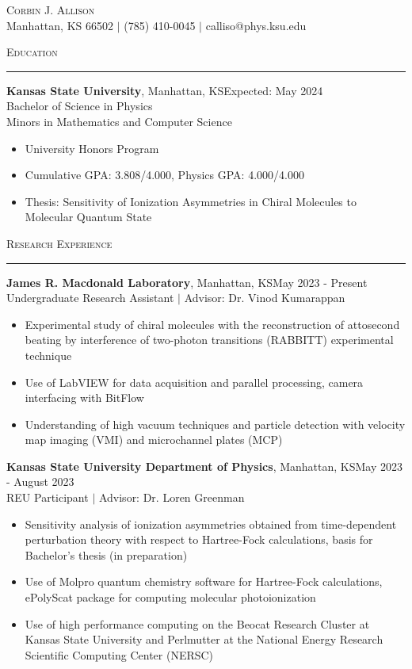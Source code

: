 \documentclass{article}
\newcommand{\sect}[1]{
\noindent\large{\textsc{#1}}\\[-6pt]\normalsize{\noindent\rule{\textwidth}{0.5pt}}
}
\begin{document}
\noindent\begin{center}
	{\huge{\textsc{Corbin J. Allison}}}\\
	Manhattan, KS 66502 $ | $ (785) 410-0045 $ | $ calliso@phys.ksu.edu
\end{center}
\sect{Education} \textbf{Kansas State University}, Manhattan, KS\hfill Expected: May 2024 \\
Bachelor of Science in Physics\\ Minors in Mathematics and Computer Science \begin{itemize}
	\item University Honors Program
	\item Cumulative GPA: 3.808/4.000, Physics GPA: 4.000/4.000
	\item Thesis: Sensitivity of Ionization Asymmetries in Chiral Molecules to Molecular Quantum State 
\end{itemize}
\sect{Research Experience}
\textbf{James R. Macdonald Laboratory}, Manhattan, KS\hfill May 2023 - Present\\
{Undergraduate Research Assistant $ | $ Advisor: Dr. Vinod Kumarappan} \begin{itemize}
	\item Experimental study of chiral molecules with the reconstruction of attosecond beating by interference of two-photon transitions (RABBITT) experimental technique
	\item Use of LabVIEW for data acquisition and parallel processing, camera interfacing with BitFlow
	\item Understanding of high vacuum techniques and particle detection with velocity map imaging (VMI) and microchannel plates (MCP)
\end{itemize}
\textbf{Kansas State University Department of Physics}, Manhattan, KS\hfill May 2023 - August 2023\\
{REU Participant $ | $ Advisor: Dr. Loren Greenman} \begin{itemize}
	\item Sensitivity analysis of ionization asymmetries obtained from time-dependent perturbation theory with respect to Hartree-Fock calculations, basis for Bachelor's thesis (in preparation)
	\item Use of Molpro quantum chemistry software for Hartree-Fock calculations, ePolyScat package for computing molecular photoionization
	\item Use of high performance computing on the Beocat Research Cluster at Kansas State University and Perlmutter at the National Energy Research Scientific Computing Center (NERSC) 
\end{itemize}
\end{document}

